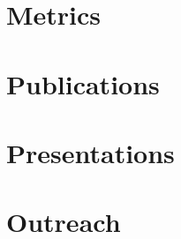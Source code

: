 \documentclass[uplatex, 12pt]{article}
\begin{document}
\section*{Metrics}

\section*{Publications}

\section*{Presentations}

\section*{Outreach}
\end{document}
